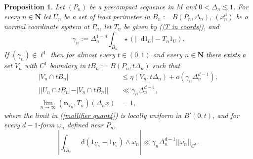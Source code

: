 \documentclass[reqno,12pt,letterpaper]{amsart}
\newcommand{\NN}{\mathbf{N}}
\newcommand*\dif{\mathop{}\!\mathrm{d}}
\newcommand{\normal}{\mathbf n}
\newtheorem{proposition}[theorem]{Proposition}
\theoremstyle{definition}
\numberwithin{equation}{section}
\begin{document}
\begin{proposition}\label{mollifier quant}
Let $(P_n)$ be a precompact sequence in $M$ and $0 < \Delta_n \lesssim 1$.
For every $n \in \NN$ let $U_n$ be a set of least perimeter in $B_n := B(P_n, \Delta_n)$, $(x^\mu_n)$ be a normal coordinate system at $P_n$, let $T_n$ be given by (\ref{T in coords}), and 
$$\gamma_n := \Delta_n^{1 - d} \int_{B_n} \star(|\dif 1_U| - T_n 1_U).$$
If $(\gamma_n) \in \ell^1$ then for almost every $t \in (0, 1)$ and every $n \in \NN$ there exists a set $V_n$ with $C^1$ boundary in $tB_n := B(P_n, t\Delta_n)$ such that 
\begin{align}
|V_n \cap tB_n| &\leq \eta(V_n, t\Delta_n) + o(\gamma_n \Delta_n^{d - 1}), \label{mollifier quant1}\\
||U_n \cap tB_n| - |V_n \cap tB_n|| &\ll \gamma_n \Delta_n^{d - 1}, \label{mollifier quant2}\\
\lim_{n \to \infty} (\normal_{V_n}, T_n)(\Delta_n x) &= 1, \label{mollifier quant4}
\end{align}
where the limit in (\ref{mollifier quant4}) is locally uniform in $B'(0, t)$, and for every $d-1$-form $\omega_n$ defined near $P_n$,
\begin{equation}\label{mollifier quant3}
\left|\int_{tB_n} \dif(1_{U_n} - 1_{V_n}) \wedge \omega_n\right| \ll \gamma_n \Delta_n^{d - 1} ||\omega_n||_{C^1}.
\end{equation}
\end{proposition}
\end{document}
